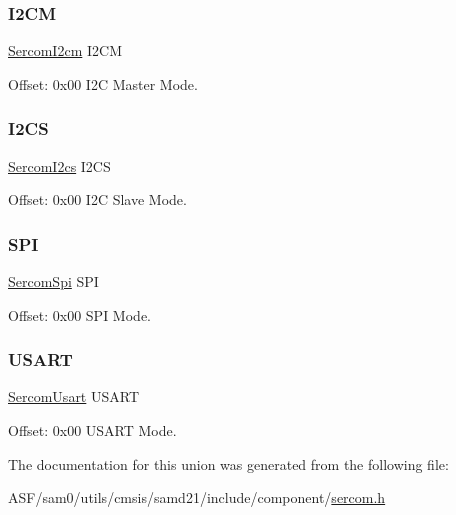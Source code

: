 \subsubsection{\texorpdfstring{I2CM}{I2CM}}
{\footnotesize\ttfamily \mbox{\hyperlink{struct_sercom_i2cm}{Sercom\+I2cm}} I2\+CM}



Offset\+: 0x00 I2C Master Mode. 

\mbox{\label{union_sercom_ab1a9da984385009f7088a4de3d6a94f2}} 
\subsubsection{\texorpdfstring{I2CS}{I2CS}}
{\footnotesize\ttfamily \mbox{\hyperlink{struct_sercom_i2cs}{Sercom\+I2cs}} I2\+CS}



Offset\+: 0x00 I2C Slave Mode. 

\mbox{\label{union_sercom_a3c7d514eed30a40532e99e043221ccf3}} 
\subsubsection{\texorpdfstring{SPI}{SPI}}
{\footnotesize\ttfamily \mbox{\hyperlink{struct_sercom_spi}{Sercom\+Spi}} S\+PI}



Offset\+: 0x00 S\+PI Mode. 

\mbox{\label{union_sercom_ad768b8d41f965d5af28dfaa85048677b}} 
\subsubsection{\texorpdfstring{USART}{USART}}
{\footnotesize\ttfamily \mbox{\hyperlink{struct_sercom_usart}{Sercom\+Usart}} U\+S\+A\+RT}



Offset\+: 0x00 U\+S\+A\+RT Mode. 



The documentation for this union was generated from the following file\+:\begin{DoxyCompactItemize}
\item 
A\+S\+F/sam0/utils/cmsis/samd21/include/component/\mbox{\hyperlink{utils_2cmsis_2samd21_2include_2component_2sercom_8h}{sercom.\+h}}\end{DoxyCompactItemize}
